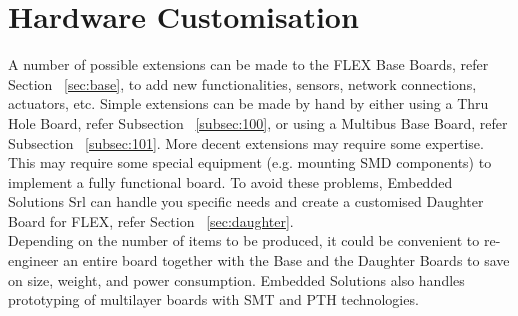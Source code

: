 \section{Hardware Customisation}
\label{sec:custom}

A number of possible extensions can be made to the FLEX Base Boards, refer Section ~\ref{sec:base}, to add new functionalities, sensors, network connections, actuators, etc. Simple extensions can be made by hand by either using a Thru Hole Board, refer Subsection ~\ref{subsec:100}, or using a Multibus Base Board, refer Subsection ~\ref{subsec:101}. More decent extensions may require some expertise. This may require some special equipment (e.g. mounting SMD components) to implement a fully functional board. To avoid these problems, Embedded Solutions Srl can handle you specific needs and create a customised Daughter Board for FLEX, refer Section ~\ref{sec:daughter}.\\

\noindent Depending on the number of items to be produced, it could be convenient to re-engineer an entire board together with the Base and the Daughter Boards to save on size, weight, and power consumption. Embedded Solutions also handles prototyping of multilayer boards with SMT and PTH technologies.\\ \\

\\